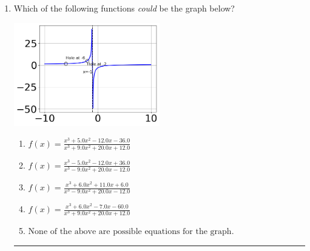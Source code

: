 \documentclass[14pt]{extbook}
\newcommand{\litem}[1]{\item#1\hspace*{-1cm}\rule{\textwidth}{0.4pt}}
\begin{document}
\begin{enumerate}
{\begin{enumerate}[label=\Alph*.]
\end{enumerate} }
\litem{
Which of the following functions \textit{could} be the graph below?
\begin{center}
    \includegraphics[width=0.5\textwidth]{../Figures/identifyGraphOfRationalFunctionC.png}
\end{center}
\begin{enumerate}[label=\Alph*.]
\item \( f(x)=\frac{x^{3} +5.0 x^{2} -12.0 x -36.0}{x^{3} +9.0 x^{2} +20.0 x + 12.0} \)
\item \( f(x)=\frac{x^{3} -5.0 x^{2} -12.0 x + 36.0}{x^{3} -9.0 x^{2} +20.0 x -12.0} \)
\item \( f(x)=\frac{x^{3} +6.0 x^{2} +11.0 x + 6.0}{x^{3} -9.0 x^{2} +20.0 x -12.0} \)
\item \( f(x)=\frac{x^{3} +6.0 x^{2} -7.0 x -60.0}{x^{3} +9.0 x^{2} +20.0 x + 12.0} \)
\item \( \text{None of the above are possible equations for the graph.} \)

\end{enumerate} }
\end{enumerate}
\end{document}
